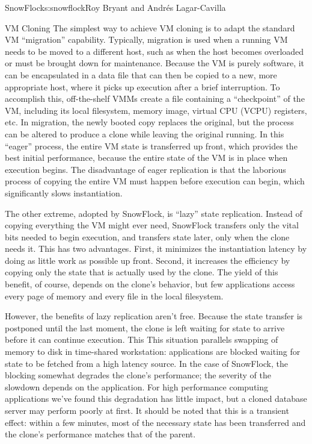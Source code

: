 \begin{aosachapter}{SnowFlock}{s:snowflock}{Roy Bryant and Andr\'e{s} Lagar-Cavilla}
\begin{aosasect1}{VM Cloning}
The simplest way to achieve VM cloning is to adapt the standard VM
``migration'' capability.  Typically, migration is used when a running
VM needs to be moved to a different host, such as when the host
becomes overloaded or must be brought down for maintenance. Because
the VM is purely software, it can be encapsulated in a data file that
can then be copied to a new, more appropriate host, where it picks up
execution after a brief interruption. To accomplish this,
off-the-shelf VMMs create a file containing a ``checkpoint'' of the VM,
including its local filesystem, memory image, virtual CPU (VCPU)
registers, etc. In migration, the newly booted copy replaces the
original, but the process can be altered to produce a clone while
leaving the original running. In this ``eager'' process, the entire VM
state is transferred up front, which provides the best initial
performance, because the entire state of the VM is in place when
execution begins.  The disadvantage of eager replication is that the
laborious process of copying the entire VM must happen before
execution can begin, which significantly slows instantiation.

The other extreme, adopted by SnowFlock, is ``lazy'' state
replication.  Instead of copying everything the VM might ever need,
SnowFlock transfers only the vital bits needed to begin execution, and
transfers state later, only when the clone needs it. This has two
advantages.  First, it minimizes the instantiation latency by doing as
little work as possible up front. Second, it increases the efficiency
by copying only the state that is actually used by the clone. The
yield of this benefit, of course, depends on the clone's behavior, but
few applications access every page of memory and every file in the
local filesystem.

However, the benefits of lazy replication aren't free. Because the
state transfer is postponed until the last moment, the clone is left
waiting for state to arrive before it can continue execution. This
This situation parallels swapping of memory to disk in time-shared workstation:
applications are blocked waiting for state to be fetched from a high latency source.
In the case of SnowFlock, the
blocking somewhat degrades the clone's performance; the severity of
the slowdown depends on the application.  For high performance
computing applications we've found this degradation has little impact,
but a cloned database server may perform poorly at first. It should be
noted that this is a transient effect: within a few minutes, most of
the necessary state has been transferred and the clone's performance
matches that of the parent.


\end{aosasect1}
\end{aosachapter}
